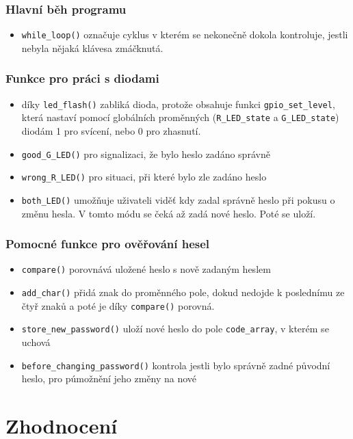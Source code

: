 \documentclass[a4paper, 11pt]{article}
\begin{document}
\subsubsection{Hlavní běh programu}
\begin{itemize}
    \item \verb!while_loop()! označuje cyklus v kterém se nekonečně dokola kontroluje, jestli nebyla nějaká klávesa zmáčknutá.
\end{itemize}

\subsubsection{Funkce pro práci s diodami}
\begin{itemize}
    \item díky \verb!led_flash()! zabliká dioda, protože obsahuje funkci \verb!gpio_set_level!, která nastaví pomocí globálních proměnných (\verb!R_LED_state! a \verb!G_LED_state!) diodám 1 pro svícení, nebo 0 pro zhasnutí.
    \item \verb!good_G_LED()! pro signalizaci, že bylo heslo zadáno správně
    \item \verb!wrong_R_LED()! pro situaci, při které bylo zle zadáno heslo
    \item \verb!both_LED()! umožňuje uživateli viděť kdy zadal správně heslo při pokusu o změnu hesla. V tomto módu se čeká až zadá nové heslo. Poté se uloží.
\end{itemize}
    
\subsubsection{Pomocné funkce pro ověřování hesel}
\begin{itemize}
    \item \verb!compare()! porovnává uložené heslo s nově zadaným heslem
    \item \verb!add_char()! přidá znak do proměnného pole, dokud nedojde k poslednímu ze čtyř znaků a poté je díky \verb!compare()! porovná.
    \item \verb!store_new_password()! uloží nové heslo do pole \verb!code_array!, v kterém se uchová
    \item \verb!before_changing_password()! kontrola jestli bylo správně zadné původní heslo, pro púmožnění jeho změny na nové
\end{itemize}

\newpage
\section{Zhodnocení}
\end{document}
